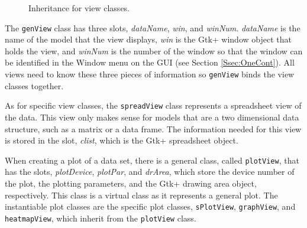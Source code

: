 \documentclass{article}[11pt]
\newcommand{\Rslot}[1]{\textsl{#1}}
\newcommand{\Rclass}[1]{\texttt{#1}}
\begin{document}
\begin{figure}[ht]
  \begin{center}
    \caption{ Inheritance for view classes. }
    \label{Fig:View}
  \end{center}
\end{figure}

The \Rclass{genView} class has three slots, \Rslot{dataName}, \Rslot{win},
and \Rslot{winNum}.  \Rslot{dataName} is the name of the model that the view
displays, \Rslot{win} is the Gtk+ window object that holds the view, and
\Rslot{winNum} is the number of the window so that the window can be
identified in the Window menu on the GUI (see Section \ref{Ssec:OneCont}).
All views need to know these three pieces of information so
\Rclass{genView} binds the view classes together. 

As for specific view classes, the \Rclass{spreadView} class
represents a spreadsheet view of the data.  This view only makes sense for
models that are a two dimensional data structure, such as a matrix or a data
frame.  The information needed for this view is stored in the slot,
\Rslot{clist}, which is the Gtk+ spreadsheet object.

When creating a plot of a data set, there is a general class, called
\Rclass{plotView}, that has the slots, \Rslot{plotDevice}, \Rslot{plotPar},
and \Rslot{drArea}, which store the device number of the plot, the plotting
parameters, and the Gtk+ drawing area object, respectively.  This class is a
virtual class as it represents a general plot.  The instantiable plot classes
are the specific plot classes, \Rclass{sPlotView}, \Rclass{graphView}, and
\Rclass{heatmapView}, which inherit from the \Rclass{plotView} class.  
\end{document}
